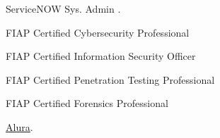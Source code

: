 

\vspace{5mm}
\begin{cvparagraph}	
  \begin{cvitems} %
    
    \item ServiceNOW Sys. Admin .
    \item FIAP Certified Cybersecurity Professional
    \item FIAP Certified Information Security Officer
    \item FIAP Certified Penetration Testing Professional
    \item FIAP Certified Forensics Professional 
    \item \href{https://cursos.alura.com.br/user/rodrigo-marzullo/fullCertificate/759dd4c674f0643b11bb9d1adff6e928}{\faCertificate\acvHeaderIconSep\/\underline{Alura}}.       
  \end{cvitems}      
 \end{cvparagraph}


